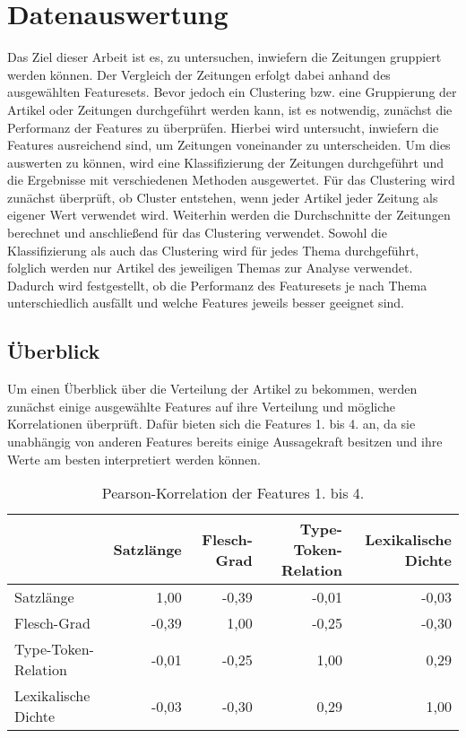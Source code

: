\chapter{Datenauswertung}
Das Ziel dieser Arbeit ist es, zu untersuchen, inwiefern die Zeitungen gruppiert werden können. Der Vergleich der Zeitungen erfolgt dabei anhand des ausgewählten Featuresets. Bevor jedoch ein Clustering bzw. eine Gruppierung der Artikel oder Zeitungen durchgeführt werden kann, ist es notwendig, zunächst die Performanz der Features zu überprüfen. Hierbei wird untersucht, inwiefern die Features ausreichend sind, um Zeitungen voneinander zu unterscheiden. Um dies auswerten zu können, wird eine Klassifizierung der Zeitungen durchgeführt und die Ergebnisse mit verschiedenen Methoden ausgewertet. Für das Clustering wird zunächst überprüft, ob Cluster entstehen, wenn jeder Artikel jeder Zeitung als eigener Wert verwendet wird. Weiterhin werden die Durchschnitte der Zeitungen berechnet und anschließend für das Clustering verwendet. Sowohl die Klassifizierung als auch das Clustering wird für jedes Thema durchgeführt, folglich werden nur Artikel des jeweiligen Themas zur Analyse verwendet. Dadurch wird festgestellt, ob die Performanz des Featuresets je nach Thema unterschiedlich ausfällt und welche Features jeweils besser geeignet sind.

\section{Überblick}
Um einen Überblick über die Verteilung der Artikel zu bekommen, werden zunächst einige ausgewählte Features auf ihre Verteilung und mögliche Korrelationen überprüft. Dafür bieten sich die Features 1. bis 4. an, da sie unabhängig von anderen Features bereits einige Aussagekraft besitzen und ihre Werte am besten interpretiert werden können.

\begin{table}
\centering
\begin{tabular}[t]{lrrrr}
\toprule
~ & Satzlänge & Flesch-Grad & Type-Token-Relation & Lexikalische Dichte\\
\midrule
Satzlänge & 1,00 & -0,39 & -0,01 & -0,03\\
Flesch-Grad & -0,39 & 1,00 & -0,25 & -0,30\\
Type-Token-Relation & -0,01 & -0,25 & 1,00 & 0,29\\
Lexikalische Dichte & -0,03 & -0,30 & 0,29 & 1,00\\
\bottomrule
\end{tabular}
\caption{Pearson-Korrelation der Features 1. bis 4.}
\label{correlation}
\end{table}

